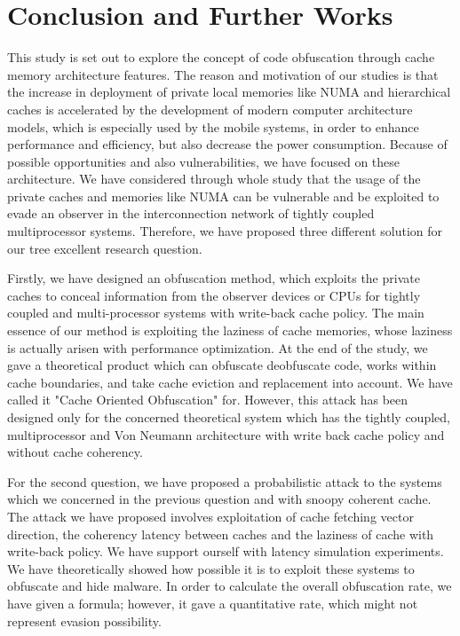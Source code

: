 \chapter{Conclusion and Further Works}
This study is set out to explore the concept of code obfuscation through cache memory architecture features. The reason and motivation of our studies is that the increase in deployment of private local memories like NUMA and hierarchical caches is accelerated by the development of modern computer architecture models, which is especially used by the mobile systems, in order to enhance performance and efficiency, but also decrease the power consumption. Because of possible opportunities and also vulnerabilities, we have focused on these architecture. We have considered through whole study that the usage of the private caches and memories like NUMA can be vulnerable and be exploited to evade an observer in the interconnection network of tightly coupled multiprocessor systems. Therefore, we have proposed three different solution for our tree excellent research question.

Firstly, we have designed an obfuscation method, which exploits the private caches to conceal information from the observer devices or CPUs for tightly coupled and multi-processor systems with write-back cache policy. The main essence of our method is exploiting the laziness of cache memories, whose laziness is actually arisen with performance optimization. At the end of the study, we gave a theoretical product which can obfuscate deobfuscate code, works within cache boundaries, and take cache eviction and replacement into account. We have called it "Cache Oriented Obfuscation" for. However, this attack has been designed only for the concerned theoretical system which has the tightly coupled, multiprocessor and Von Neumann architecture with write back cache policy and without cache coherency. 

For the second question, we have proposed a probabilistic attack to the systems which we concerned in the previous question and with snoopy coherent cache. The attack we have proposed involves exploitation of cache fetching vector direction, the coherency latency between caches and the laziness of cache with write-back policy. We have support ourself with latency simulation experiments. We have theoretically showed how possible it is to exploit these systems to obfuscate and hide malware. In order to calculate the overall obfuscation rate, we have given a formula; however, it gave a quantitative rate, which might not represent evasion possibility.

